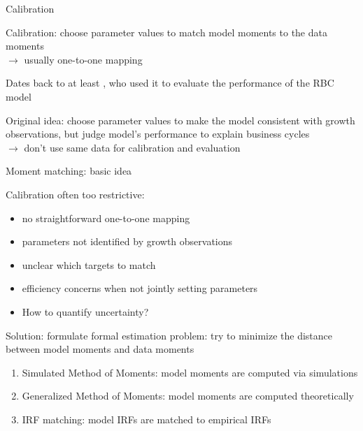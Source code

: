 \begin{frame}{Calibration}

  \begin{witemize}
    \item Calibration: choose parameter values to match model moments to the data moments\\
    $\rightarrow$ usually one-to-one mapping
    \item Dates back to at least \textcite{KydlandPrescott1982}, who used it to evaluate the performance of the RBC model
    \item Original idea: choose parameter values to make the model consistent with growth observations, but judge model's performance to explain business cycles\\
    $\rightarrow$ don't use same data for calibration and evaluation
  \end{witemize}

\end{frame}


\begin{frame}{Moment matching: basic idea}

  \begin{witemize}
    \item Calibration often too restrictive:
    \begin{itemize}
      \item no straightforward one-to-one mapping\\
      \item parameters not identified by growth observations
      \item unclear which targets to match
      \item efficiency concerns when not jointly setting parameters
      \item How to quantify uncertainty?
    \end{itemize}
    \item Solution: formulate formal estimation problem: try to minimize the distance between model moments and data moments
    \begin{enumerate}
      \item Simulated Method of Moments: model moments are computed via simulations
      \item Generalized Method of Moments: model moments are computed theoretically
      \item IRF matching: model IRFs are matched to empirical IRFs
    \end{enumerate}
  \end{witemize}

\end{frame}


